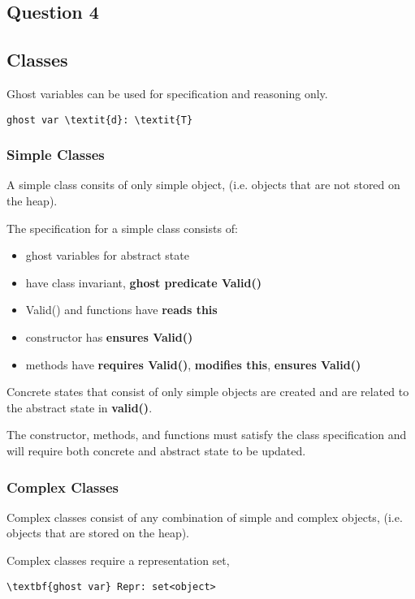 \subsection{Question 4}
\subsection{Classes}
Ghost variables can be used for specification and reasoning only.
\begin{Verbatim}[commandchars=\\\{\}]
    ghost var \textit{d}: \textit{T}
\end{Verbatim}

\subsubsection{Simple Classes}
A simple class consits of only simple object, (i.e. objects that are not stored on the heap).

The specification for a simple class consists of:
\begin{itemize}
    \item ghost variables for abstract state
    \item have class invariant, \textbf{ghost predicate Valid()}
    \item Valid() and functions have \textbf{reads this}
    \item constructor has \textbf{ensures Valid()}
    \item methods have \textbf{requires Valid()}, \textbf{modifies this}, \textbf{ensures Valid()}
\end{itemize}

Concrete states that consist of only simple objects are created and are related to the abstract state in \textbf{valid()}.

The constructor, methods, and functions must satisfy the class specification and will require both concrete and abstract state to be updated.

\subsubsection{Complex Classes}
Complex classes consist of any combination of simple and complex objects, (i.e. objects that are stored on the heap).

Complex classes require a representation set,
\begin{Verbatim}[commandchars=\\\{\}]
    \textbf{ghost var} Repr: set<object>
\end{Verbatim}

